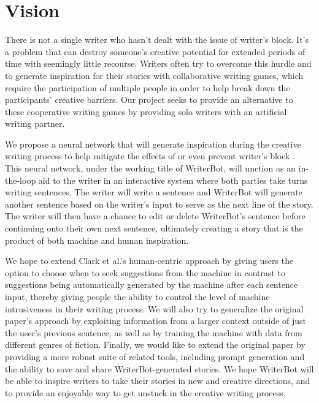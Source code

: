 \section{Vision}\label{sec:vison}
There is not a single writer who hasn’t dealt with the issue of writer's block.
It’s a problem that can destroy someone's creative potential for extended periods
of time with seemingly little recourse.  Writers often try to overcome this hurdle
and to generate inspiration for their stories with collaborative writing games,
which require the participation of multiple people in order to help break down
the participants’ creative barriers. Our project seeks to provide an alternative
to these cooperative writing games by providing solo writers with an artificial
writing partner.

We propose a neural network that will generate inspiration during the creative
writing process to help mitigate the effects of or even prevent writer's block
\cite{clark}. This neural network, under the working title of WriterBot, will
unction as an in-the-loop aid to the writer in an interactive system where both
parties take turns writing sentences. The writer will write a sentence and
WriterBot will generate another sentence based on the writer’s input to serve
as the next line of the story. The writer will then have a chance to edit or
delete WriterBot’s sentence before continuing onto their own next sentence,
ultimately creating a story that is the product of both machine and human
inspiration.

We hope to extend Clark et al.’s\cite{clark} human-centric approach by giving users the
option to choose when to seek suggestions from the machine \cite{creative_help} 
in contrast to suggestions being automatically generated by the machine after
each sentence input, thereby giving people the ability to control the level of
machine intrusiveness in their writing process.  We will also try to generalize
the original paper’s approach by exploiting information from a larger context
outside of just the user’s previous sentence, as well as by training the machine
with data from different genres of fiction.  Finally, we would like to extend the
original paper by providing a more robust suite of related tools, including prompt
generation and the ability to save and share WriterBot-generated stories.
We hope WriterBot will be able to inspire writers to take their stories in
new and creative directions, and to provide an enjoyable way to get unstuck
in the creative writing process.
